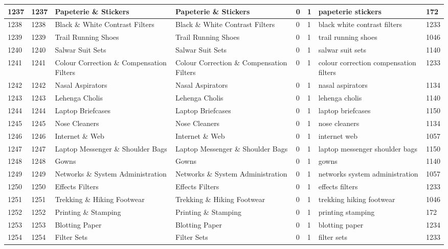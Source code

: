 \begin{longtable}{|l|l|l|l|l|l|l|l|}
1237 & 1237 & Papeterie \& Stickers & Papeterie \& Stickers & 0 & 1 & papeterie stickers & 172 \\ \hline 
1238 & 1238 & Black \& White Contrast Filters & Black \& White Contrast Filters & 0 & 1 & black white contrast filters & 1233 \\ \hline 
1239 & 1239 & Trail Running Shoes & Trail Running Shoes & 0 & 1 & trail running shoes & 1046 \\ \hline 
1240 & 1240 & Salwar Suit Sets & Salwar Suit Sets & 0 & 1 & salwar suit sets & 1140 \\ \hline 
1241 & 1241 & Colour Correction \& Compensation Filters & Colour Correction \& Compensation Filters & 0 & 1 & colour correction compensation filters & 1233 \\ \hline 
1242 & 1242 & Nasal Aspirators & Nasal Aspirators & 0 & 1 & nasal aspirators & 1134 \\ \hline 
1243 & 1243 & Lehenga Cholis & Lehenga Cholis & 0 & 1 & lehenga cholis & 1140 \\ \hline 
1244 & 1244 & Laptop Briefcases & Laptop Briefcases & 0 & 1 & laptop briefcases & 1150 \\ \hline 
1245 & 1245 & Nose Cleaners & Nose Cleaners & 0 & 1 & nose cleaners & 1134 \\ \hline 
1246 & 1246 & Internet \& Web & Internet \& Web & 0 & 1 & internet web & 1057 \\ \hline 
1247 & 1247 & Laptop Messenger \& Shoulder Bags & Laptop Messenger \& Shoulder Bags & 0 & 1 & laptop messenger shoulder bags & 1150 \\ \hline 
1248 & 1248 & Gowns & Gowns & 0 & 1 & gowns & 1140 \\ \hline 
1249 & 1249 & Networks \& System Administration & Networks \& System Administration & 0 & 1 & networks system administration & 1057 \\ \hline 
1250 & 1250 & Effects Filters & Effects Filters & 0 & 1 & effects filters & 1233 \\ \hline 
1251 & 1251 & Trekking \& Hiking Footwear & Trekking \& Hiking Footwear & 0 & 1 & trekking hiking footwear & 1046 \\ \hline 
1252 & 1252 & Printing \& Stamping & Printing \& Stamping & 0 & 1 & printing stamping & 172 \\ \hline 
1253 & 1253 & Blotting Paper & Blotting Paper & 0 & 1 & blotting paper & 1234 \\ \hline 
1254 & 1254 & Filter Sets & Filter Sets & 0 & 1 & filter sets & 1233 \\ \hline 

\end{longtable}
